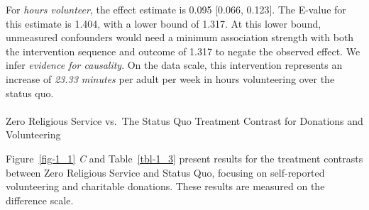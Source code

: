 \documentclass[
  single column]{article}
\makeatletter
\let\oldparagraph\paragraph
\renewcommand{\paragraph}{
    \@ifstar
      \xxxParagraphStar
      \xxxParagraphNoStar
  }
\newcommand{\xxxParagraphStar}[1]{\oldparagraph*{#1}\mbox{}}
\newcommand{\xxxParagraphNoStar}[1]{\oldparagraph{#1}\mbox{}}
\makeatother
\begin{document}
For \emph{hours volunteer}, the effect estimate is 0.095 {[}0.066,
0.123{]}. The E-value for this estimate is 1.404, with a lower bound of
1.317. At this lower bound, unmeasured confounders would need a minimum
association strength with both the intervention sequence and outcome of
1.317 to negate the observed effect. We infer \emph{evidence for
causality}. On the data scale, this intervention represents an increase
of \emph{23.33 minutes} per adult per week in hours volunteering over
the status quo.

\paragraph{Zero Religious Service vs.~The Status Quo Treatment Contrast
for Donations and
Volunteering}\label{zero-religious-service-vs.-the-status-quo-treatment-contrast-for-donations-and-volunteering}

Figure~\ref{fig-1_1} \emph{C} and Table~\ref{tbl-1_3} present results
for the treatment contrasts between Zero Religious Service and Status
Quo, focusing on self-reported volunteering and charitable donations.
These results are measured on the difference scale.
\end{document}
